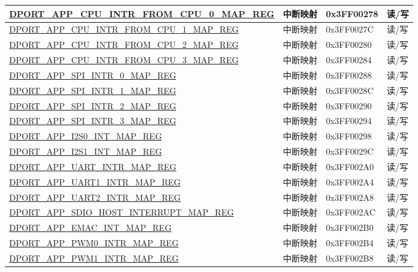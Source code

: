 \begin{longtable}{|L{8.2cm}|L{4.5cm}| l | l | }
\hyperref[regdesc:APPCPUINTRFROMCPU0MAPREG]{DPORT\_APP\_CPU\_INTR\_FROM\_CPU\_0\_MAP\_REG} & 中断映射 & 0x3FF00278 & 读/写 \\ \hline
\hyperref[regdesc:APPCPUINTRFROMCPU1MAPREG]{DPORT\_APP\_CPU\_INTR\_FROM\_CPU\_1\_MAP\_REG} & 中断映射 & 0x3FF0027C & 读/写 \\ \hline
\hyperref[regdesc:APPCPUINTRFROMCPU2MAPREG]{DPORT\_APP\_CPU\_INTR\_FROM\_CPU\_2\_MAP\_REG} & 中断映射 & 0x3FF00280 & 读/写 \\ \hline
\hyperref[regdesc:APPCPUINTRFROMCPU3MAPREG]{DPORT\_APP\_CPU\_INTR\_FROM\_CPU\_3\_MAP\_REG} & 中断映射 & 0x3FF00284 & 读/写 \\ \hline
\hyperref[regdesc:APPSPIINTR0MAPREG]{DPORT\_APP\_SPI\_INTR\_0\_MAP\_REG} & 中断映射 & 0x3FF00288 & 读/写 \\ \hline
\hyperref[regdesc:APPSPIINTR1MAPREG]{DPORT\_APP\_SPI\_INTR\_1\_MAP\_REG} & 中断映射 & 0x3FF0028C & 读/写 \\ \hline
\hyperref[regdesc:APPSPIINTR2MAPREG]{DPORT\_APP\_SPI\_INTR\_2\_MAP\_REG} & 中断映射 & 0x3FF00290 & 读/写 \\ \hline
\hyperref[regdesc:APPSPIINTR3MAPREG]{DPORT\_APP\_SPI\_INTR\_3\_MAP\_REG} & 中断映射 & 0x3FF00294 & 读/写 \\ \hline
\hyperref[regdesc:APPI2S0INTMAPREG]{DPORT\_APP\_I2S0\_INT\_MAP\_REG} & 中断映射 & 0x3FF00298 & 读/写 \\ \hline
\hyperref[regdesc:APPI2S1INTMAPREG]{DPORT\_APP\_I2S1\_INT\_MAP\_REG} & 中断映射 & 0x3FF0029C & 读/写 \\ \hline
\hyperref[regdesc:APPUARTINTRMAPREG]{DPORT\_APP\_UART\_INTR\_MAP\_REG} & 中断映射 & 0x3FF002A0 & 读/写 \\ \hline
\hyperref[regdesc:APPUART1INTRMAPREG]{DPORT\_APP\_UART1\_INTR\_MAP\_REG} & 中断映射 & 0x3FF002A4 & 读/写 \\ \hline
\hyperref[regdesc:APPUART2INTRMAPREG]{DPORT\_APP\_UART2\_INTR\_MAP\_REG} & 中断映射 & 0x3FF002A8 & 读/写 \\ \hline
\hyperref[regdesc:APPSDIOHOSTINTERRUPTMAPREG]{DPORT\_APP\_SDIO\_HOST\_INTERRUPT\_MAP\_REG} & 中断映射 & 0x3FF002AC & 读/写 \\ \hline
\hyperref[regdesc:APPEMACINTMAPREG]{DPORT\_APP\_EMAC\_INT\_MAP\_REG} & 中断映射 & 0x3FF002B0 & 读/写 \\ \hline
\hyperref[regdesc:APPPWM0INTRMAPREG]{DPORT\_APP\_PWM0\_INTR\_MAP\_REG} & 中断映射 & 0x3FF002B4 & 读/写 \\ \hline
\hyperref[regdesc:APPPWM1INTRMAPREG]{DPORT\_APP\_PWM1\_INTR\_MAP\_REG} & 中断映射 & 0x3FF002B8 & 读/写 \\ \hline

\end{longtable}
